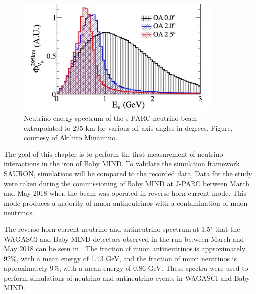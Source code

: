 \begin{figure}[h!]
\centering
\includegraphics[width=0.9\textwidth]{figures/NeutrinoChap/offAxisFlux.jpeg}
\caption{Neutrino energy spectrum of the J-PARC neutrino beam extrapolated to 295 km for various off-axis angles in degrees. Figure, courtesy of Akihiro Minamino.}
\label{fig:T2KAxis2}
\end{figure}



The goal of this chapter is to perform the first measurement of neutrino interactions in the iron of Baby MIND. To validate the simulation framework SAURON, simulations will be compared to the recorded data. Data for the study were taken during the commissioning of Baby MIND at J-PARC between March and May 2018 when the beam was operated in reverse horn current mode. This mode produces a majority of muon antineutrinos with a contamination of muon neutrinos.

The reverse horn current neutrino and antineutrino spectrum at 1.5$^\circ$ that the WAGASCI and Baby MIND detectors observed in the run between March and May 2018 can be seen in . The fraction of muon antineutrinos is approximately 92\%, with a mean energy of 1.43 GeV, and the fraction of muon neutrinos is approximately 9\%, with a mean energy of 0.86 GeV. These spectra were used to perform simulations of neutrino and antineutrino events in WAGASCI and Baby MIND.

